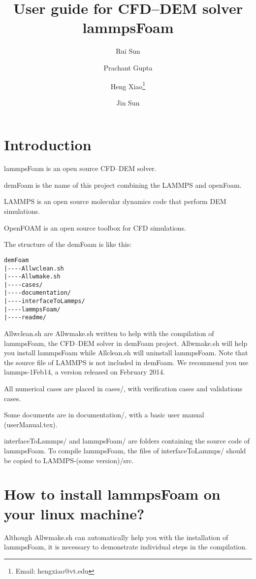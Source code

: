 \documentclass[11pt]{article}
\title{User guide for CFD--DEM solver lammpsFoam}
\author[1]{Rui Sun}
\author[2]{Prachant Gupta}
\author[1]{Heng Xiao\thanks{Email: hengxiao@vt.edu}}
\author[2]{Jin Sun}
\affil[1]{Department of Aerospace and Ocean Engineering, Virginia Tech, Blacksburg, Virginia, United
States}
\affil[2]{Institute for Infrastructure and Environment, The University of Edinburgh, UK}
\date{}
\begin{document}
\maketitle

\section{Introduction}

lammpsFoam is an open source CFD--DEM solver.

demFoam is the name of this project combining the LAMMPS and openFoam.

LAMMPS is an open source molecular dynamics code that perform DEM simulations.

OpenFOAM is an open source toolbox for CFD simulations.

The structure of the demFoam is like this:

\begin{lstlisting}
demFoam
|----Allwclean.sh
|----Allwmake.sh
|----cases/
|----documentation/
|----interfaceToLammps/
|----lammpsFoam/
|----readme/
\end{lstlisting}

Allwclean.sh are Allwmake.sh written to help with the compilation of lammpsFoam, the CFD--DEM solver
in demFoam project. Allwmake.sh will help you install lammpsFoam while Allclean.sh will uninstall
lammpsFoam. Note that the source file of LAMMPS is not included in demFoam. We recommend you use
lammps-1Feb14, a version released on February 2014.

All numerical cases are placed in cases/, with verification cases and validations cases.

Some documents are in documentation/, with a basic user manual (userManual.tex).

interfaceToLammps/ and lammpsFoam/ are folders containing the source code of lammpsFoam. To compile
lammpsFoam, the files of interfaceToLammps/ should be copied to LAMMPS-(some version)/src.

\section{How to install lammpsFoam on your linux machine?}

Although Allwmake.sh can automatically help you with the installation of lammpsFoam, it is necessary
to demonstrate individual steps in the compilation.
\end{document}
